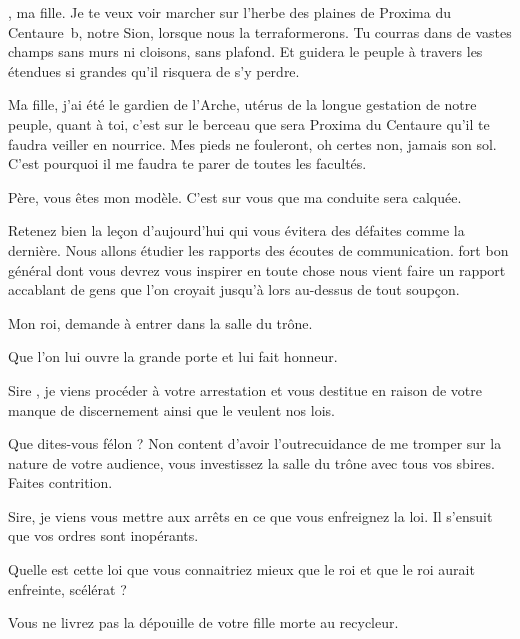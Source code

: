 \begin{drama}

  \roispeaks {} \princesse, ma fille. Je te veux voir marcher sur l’herbe des plaines de Proxima du Centaure~b, notre Sion, lorsque nous la terraformerons. Tu courras dans de vastes champs sans murs ni cloisons, sans plafond. Et guidera le peuple à travers les étendues si grandes qu’il risquera de s’y perdre.

  Ma fille, j’ai été le gardien de l’Arche, utérus de la longue gestation de notre peuple, quant à toi, c’est sur le berceau que sera Proxima du Centaure qu’il te faudra veiller en nourrice. Mes pieds ne fouleront, oh certes non, jamais son sol. C’est pourquoi il me faudra te parer de toutes les facultés.

  \elaspeaks Père, vous êtes mon modèle. C’est sur vous que ma conduite sera calquée.

  \roispeaks Retenez bien la leçon d’aujourd’hui qui vous évitera des défaites comme la dernière. Nous allons étudier les rapports des écoutes de communication. \general{} fort bon général dont vous devrez vous inspirer en toute chose nous vient faire un rapport accablant de gens que l’on croyait jusqu’à lors au-dessus de tout soupçon.

   Mon roi, \general demande à entrer dans la salle du trône.

  \roispeaks Que l’on lui ouvre la grande porte et lui fait honneur.



  \generalspeaks Sire \roi, je viens procéder à votre arrestation et vous destitue en raison de votre manque de discernement ainsi que le veulent nos lois.

  \roispeaks Que dites-vous félon ? Non content d’avoir l’outrecuidance de me tromper sur la nature de votre audience, vous investissez la salle du trône avec tous vos sbires. Faites contrition.

  \generalspeaks Sire, je viens vous mettre aux arrêts en ce que vous enfreignez la loi. Il s’ensuit que vos ordres sont inopérants.

  \roispeaks Quelle est cette loi que vous connaitriez mieux que le roi et que le roi aurait enfreinte, scélérat ?

  \generalspeaks Vous ne livrez pas la dépouille de votre fille morte au recycleur.


\end{drama}

